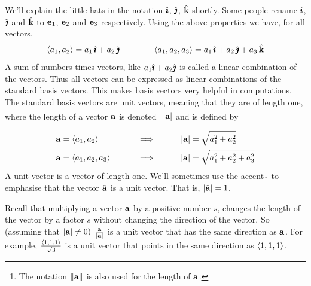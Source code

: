 We'll explain the little hats in the notation $\hat{\pmb{\imath}}$, $\hat{\pmb{\jmath}}$, $\hat{\mathbf{k}}$ shortly.
Some people rename $\hat{\pmb{\imath}}$, $\hat{\pmb{\jmath}}$ and $\hat{\mathbf{k}}$ to $\mathbf{e}_1$, $\mathbf{e}_2$ and 
$\mathbf{e}_3$ respectively.
Using the above properties we have, for all vectors,
\begin{equation*}
\left< a_1,a_2\right> =a_1\,\hat{\pmb{\imath}}+a_2\,\hat{\pmb{\jmath}}\qquad\qquad
\left< a_1,a_2,a_3\right> =a_1\,\hat{\pmb{\imath}}+a_2\,\hat{\pmb{\jmath}}+a_3\,\hat{\mathbf{k}}
\end{equation*}
A sum of numbers times vectors, like $a_1\hat{\pmb{\imath}}+a_2\hat{\pmb{\jmath}}$ is called
a linear combination of the vectors.
Thus all vectors can be expressed as linear combinations of the standard
basis vectors. This makes basis vectors very helpful in computations.
The  standard basis vectors are unit vectors, meaning that they are of 
length one, where the length of a vector $\mathbf{a}$ is denoted\footnote{The notation $\|\mathbf{a}\|$ is also used for the length of $\mathbf{a}$.} $|\mathbf{a}|$ 
and is defined by
\begin{defn}\label{def:vectLen}
\begin{alignat*}{5}
&\mathbf{a}=\left< a_1,a_2\right> \qquad&&\implies\qquad &&|\mathbf{a}|=\sqrt{a_1^2+a_2^2}\\
&\mathbf{a}=\left< a_1,a_2,a_3\right> \qquad&&\implies\qquad &&|\mathbf{a}|=\sqrt{a_1^2+a_2^2+a_3^2}
\end{alignat*}
A unit vector is a vector of length one. We'll sometimes use the accent 
$\hat{\ }$ to emphasise that the vector $\hat{\mathbf{a}}$ is a unit vector.
That is, $|\hat{\mathbf{a}}|=1$.
\end{defn}


\begin{eg}\label{eg unit vector}
Recall that multiplying a vector $\mathbf{a}$ by a positive number $s$,
changes the length of the vector by a factor $s$ without changing
the direction of the vector. So (assuming that $|\mathbf{a}|\ne 0)$
$\frac{\mathbf{a}}{|\mathbf{a}|}$ is a unit vector that has the same direction as
$\mathbf{a}$. For example, $\frac{\left< 1,1,1\right>}{\sqrt{3}}$ is a unit vector
that points in the same direction as $\left< 1,1,1\right>$.
\end{eg}
\goodbreak

